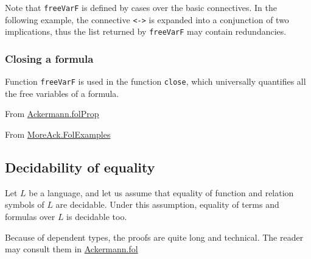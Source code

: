 


\begin{remark}
  Note that \texttt{freeVarF} is defined by cases over the basic connectives. In the following example, the connective \texttt{<->} is expanded into a conjunction of two implications, thus the 
list returned by \texttt{freeVarF} may contain redundancies.



\end{remark}

\subsubsection{Closing a formula}
Function \texttt{freeVarF} is used in 
the  function \texttt{close}, which  universally quantifies  all the free variables of a formula.

\noindent From \href{../theories/html/hydras.Ackermann.folProp.html}{Ackermann.folProp}


\noindent From \href{../theories/html/hydras.MoreAck.FolExamples.html}{MoreAck.FolExamples}




\subsection{Decidability of equality}

Let $L$ be a language, and let us assume that equality 
of function and relation symbols of $L$ are decidable.
Under this assumption, equality of terms and formulas over $L$ is decidable too.

Because of dependent types, the proofs are quite long and technical. The reader may consult them in \href{../theories/html/hydras.Ackermann.fol.html}{Ackermann.fol}



